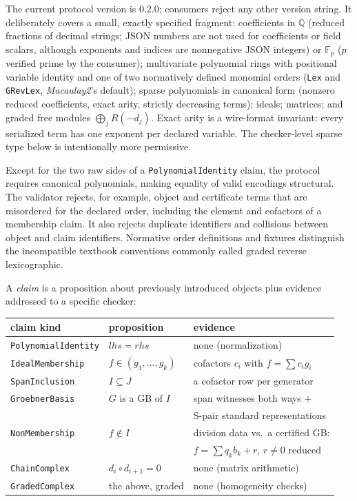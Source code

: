 \documentclass[11pt]{article}
\newcommand{\M}{\textit{Macaulay2}}
\newcommand{\QQ}{\mathbb{Q}}
\newcommand{\code}[1]{\texttt{#1}}
\begin{document}
The current protocol version is 0.2.0; consumers reject any other
version string.  It deliberately covers a small, exactly specified
fragment: coefficients in $\QQ$ (reduced fractions of decimal
strings; JSON numbers are not used for coefficients or field scalars,
although exponents and indices are nonnegative JSON integers)
or $\mathbb{F}_p$ ($p$ verified prime by the consumer); multivariate
polynomial rings with positional variable identity and one of two
normatively defined monomial orders (\code{Lex} and \code{GRevLex},
\M{}'s default); sparse polynomials in canonical form (nonzero
reduced coefficients, exact arity, strictly decreasing terms); ideals;
matrices; and graded free modules $\bigoplus_j R(-d_j)$.
Exact arity is a wire-format invariant: every serialized term has one
exponent per declared variable.  The checker-level sparse type below
is intentionally more permissive.

Except for the two raw sides of a \code{PolynomialIdentity} claim, the
protocol requires canonical polynomials, making equality of valid
encodings structural.  The validator rejects, for example, object and
certificate terms that are misordered for the declared order, including
the element and cofactors of a membership claim.  It also rejects
duplicate identifiers and collisions between object and claim identifiers.
Normative order definitions and fixtures distinguish the incompatible
textbook conventions commonly called graded reverse lexicographic.

A \emph{claim} is a proposition about previously introduced objects
plus evidence addressed to a specific checker:

\begin{center}
\small
\begin{tabular}{lll}
\toprule
claim kind & proposition & evidence \\
\midrule
\code{PolynomialIdentity} & $\mathit{lhs} = \mathit{rhs}$ & none (normalization) \\
\code{IdealMembership} & $f \in (g_1,\dots,g_k)$ & cofactors $c_i$ with $f = \sum c_i g_i$ \\
\code{SpanInclusion} & $I \subseteq J$ & a cofactor row per generator \\
\code{GroebnerBasis} & $G$ is a GB of $I$ & span witnesses both ways $+$ \\
& & S-pair standard representations \\
\code{NonMembership} & $f \notin I$ & division data vs.\ a certified GB: \\
& & $f = \sum q_k b_k + r$, $r \neq 0$ reduced \\
\code{ChainComplex} & $d_i \circ d_{i+1} = 0$ & none (matrix arithmetic) \\
\code{GradedComplex} & the above, graded & none (homogeneity checks) \\
\bottomrule
\end{tabular}
\end{center}
\end{document}
